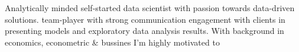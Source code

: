 \documentclass[letter,10pt]{article}
\begin{document}
\justify

Analytically minded self-started data scientist with passion towards data-driven solutions.
team-player with strong communication
engagement with clients in presenting models and exploratory data analysis results. With background in economics, econometric \& bussines I'm highly motivated to 
\end{document}

